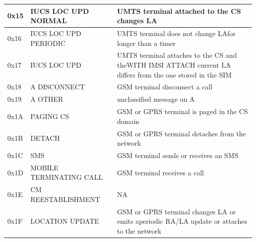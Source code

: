 \documentclass[master,english]{hgbthesis}
\begin{document}
{\begin{longtable}{|l|p{4cm}|p{8cm}|}
		0x15         & IUCS LOC UPD NORMAL                  & UMTS terminal attached to the CS changes LA                                                                \\ \hline

		0x16         & IUCS LOC UPD PERIODIC                & UMTS terminal does not change LAfor longer than a timer                                                    \\ \hline

		0x17         & IUCS LOC UPD                         & UMTS terminal attaches to the CS and theWITH IMSI ATTACH current LA differs from the one stored in the SIM \\ \hline

		0x18         & A DISCONNECT                         & GSM terminal disconnect a call                                                                             \\ \hline

		0x19         & A OTHER                              & unclassified message on A                                                                                  \\ \hline

		0x1A         & PAGING CS                            & GSM or GPRS terminal is paged in the CS domain                                                             \\ \hline

		0x1B         & DETACH                               & GSM or GPRS terminal detaches from the network                                                             \\ \hline

		0x1C         & SMS                                  & GSM terminal sends or receives an SMS                                                                      \\ \hline

		0x1D         & MOBILE TERMINATING CALL              & GSM terminal receives a call                                                                               \\ \hline

		0x1E         & CM REESTABLISHMENT                   & NA                                                                                                         \\ \hline

		0x1F         & LOCATION UPDATE                      & GSM or GPRS terminal changes LA or emits aperiodic RA/LA update or attaches to the network                 \\ \hline


\end{longtable}}
\end{document}
